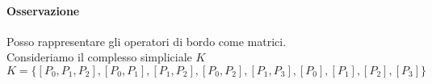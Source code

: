 \documentclass[a4paper]{report}
\begin{document}
\paragraph{Osservazione} Posso rappresentare gli operatori di bordo come matrici.\\
Consideriamo il complesso simpliciale $K$
\[
    K=\{[P_0,P_1,P_2],[P_0,P_1],[P_1,P_2],[P_0,P_2],[P_1,P_3],[P_0],[P_1],[P_2],[P_3]\}
\]
\begin{center}



    \begin{tikzpicture}[x=0.75pt,y=0.75pt,yscale=-1,xscale=1]


\end{tikzpicture}
\end{center}
\end{document}
